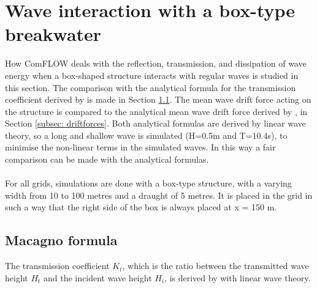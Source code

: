 \section{Wave interaction with a box-type breakwater}
\label{sec: box-type breakwater}
How ComFLOW deals with the reflection, transmission, and dissipation of wave energy when a box-shaped
structure interacts with regular waves is studied in this section. The comparison with the analytical formula for the transmission coefficient derived by \citet{macagno1953fluid} is made in Section \ref{subsec: Macagno formula}. The mean wave drift force acting on the structure is compared to the analytical mean wave drift force derived by \citep{longuethiggins1977}, in Section \ref{subsec: driftforces}. Both analytical formulas are derived by linear wave theory, so a long and shallow wave is simulated (H=0.5m and T=10.4s), to minimise the non-linear terms in the simulated waves. In this way a fair comparison can be made with the analytical formulas. \\
\\
For all grids, simulations are done with a box-type structure, with a varying width from 10 to 100 metres and a draught of 5 metres. It is placed in the grid in such a way that the right side of the box is always placed at x = 150 m. 



\subsection{Macagno formula}
\label{subsec: Macagno formula}
The transmission coefficient $K_t$, which is the ratio between the transmitted wave height $H_t$ and the incident wave height $H_i$, is derived by \citet{macagno1953fluid} with linear wave theory.


